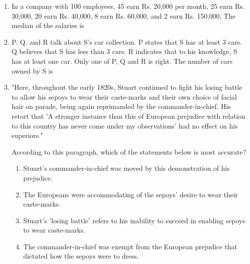 \documentclass[journal]{IEEEtran}
\begin{document}
\begin{enumerate}[leftmargin=0pt]
    \item In a company with 100 employees, 45 earn Rs. 20,000 per month, 25 earn Rs. 30,000, 20 earn Rs. 40,000, 8 earn Rs. 60,000, and 2 earn Rs. 150,000. The median of the salaries is
    \hfill{}
    \begin{enumerate}
    \end{enumerate}

    \item P. Q. and R talk about S's car collection. P states that S has at least 3 cars. Q believes that S has less than 3 cars. R indicates that to his knowledge, S has at least one car. Only one of P, Q and R is right. The number of cars owned by S is
    \hfill{}
    \begin{enumerate}
    \end{enumerate}

    \item "Here, throughout the early 1820s, Stuart continued to fight his losing battle to allow his sepoys to wear their caste-marks and their own choice of facial hair on parade, being again reprimanded by the commander-in-chief. His retort that 'A stronger instance than this of European prejudice with relation to this country has never come under my observations' had no effect on his superiors."
    

    According to this paragraph, which of the statements below is most accurate?
    \hfill{}
    \begin{enumerate}
            \item Stuart's commander-in-chief was moved by this demonstration of his prejudice.
            \item The Europeans were accommodating of the sepoys' desire to wear their caste-marks.
            \item Stuart's 'losing battle' refers to his inability to succeed in enabling sepoys to wear caste-marks.
            \item The commander-in-chief was exempt from the European prejudice that dictated how the sepoys were to dress.
    \end{enumerate}


\end{enumerate}
\end{document}
